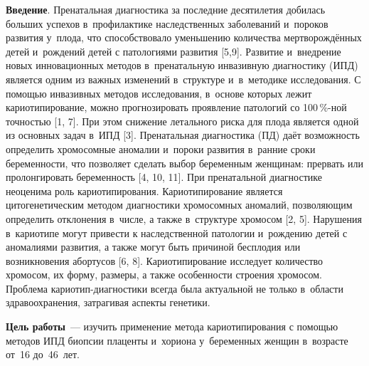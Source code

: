 \vspace{-16pt}



\makeProcTitleIIRazdel
{}

\textbf{Введение}. Пренатальная диагностика за последние десятилетия добилась больших успехов в~профилактике наследственных заболеваний и~пороков развития у~плода, что способствовало уменьшению количества мертворождённых детей и~рождений детей с патологиями развития [5,9]. Развитие и~внедрение новых инновационных методов в~пренатальную инвазивную диагностику (ИПД) является одним из важных изменений в~структуре и~в~методике исследования. С помощью инвазивных методов исследования, в~основе которых лежит кариотипирование, можно прогнозировать проявление патологий со 100\,\%-ной точностью [1, 7]. При этом снижение летального риска для плода является одной из основных задач в~ИПД [3]. Пренатальная диагностика (ПД) даёт возможность определить хромосомные аномалии и~пороки развития в~ранние сроки беременности, что позволяет сделать выбор беременным женщинам: прервать или пролонгировать беременность [4, 10, 11]. При пренатальной диагностике неоценима роль кариотипирования. Кариотипирование является цитогенетическим методом диагностики хромосомных аномалий, позволяющим определить отклонения в~числе, а также в~структуре хромосом [2, 5]. Нарушения в~кариотипе могут привести к наследственной патологии и~рождению детей с аномалиями развития, а также могут быть причиной бесплодия или возникновения абортусов [6, 8]. Кариотипирование исследует количество хромосом, их форму, размеры, а также особенности строения хромосом. Проблема кариотип-диагностики всегда была актуальной не только в~области здравоохранения, затрагивая аспекты генетики.

\textbf{Цель работы}~--- изучить применение метода кариотипирования с помощью методов ИПД биопсии плаценты и~хориона у~беременных женщин в~возрасте от~16 до~46~лет.

